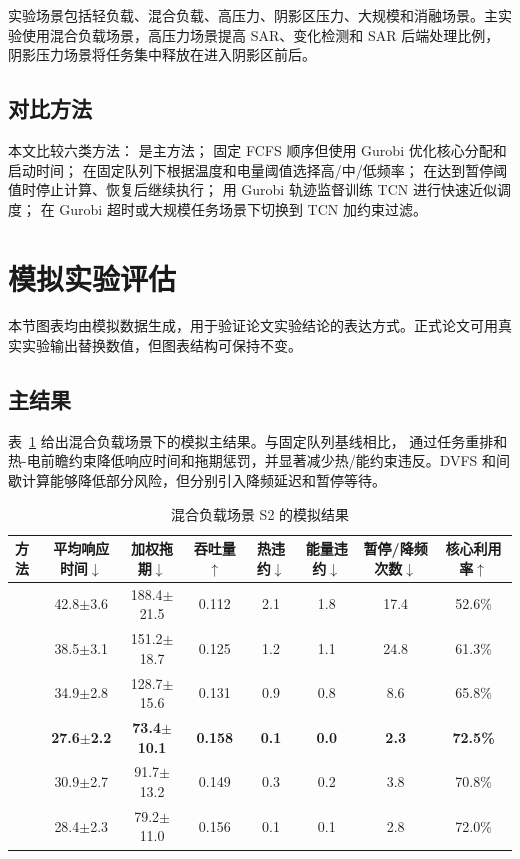 实验场景包括轻负载、混合负载、高压力、阴影区压力、大规模和消融场景。主实验使用混合负载场景，高压力场景提高 SAR、变化检测和 SAR 后端处理比例，阴影压力场景将任务集中释放在进入阴影区前后。

\subsection{对比方法}

本文比较六类方法：\rhcfull{} 是主方法；\fcfsg{} 固定 FCFS 顺序但使用 Gurobi 优化核心分配和启动时间；\dvfs{} 在固定队列下根据温度和电量阈值选择高/中/低频率；\intermittent{} 在达到暂停阈值时停止计算、恢复后继续执行；\tcns{} 用 Gurobi 轨迹监督训练 TCN 进行快速近似调度；\hybrid{} 在 Gurobi 超时或大规模任务场景下切换到 TCN 加约束过滤。

\section{模拟实验评估}

本节图表均由模拟数据生成，用于验证论文实验结论的表达方式。正式论文可用真实实验输出替换数值，但图表结构可保持不变。

\subsection{主结果}

表~\ref{tab:main-results} 给出混合负载场景下的模拟主结果。与固定队列基线相比，\rhcfull{} 通过任务重排和热-电前瞻约束降低响应时间和拖期惩罚，并显著减少热/能约束违反。DVFS 和间歇计算能够降低部分风险，但分别引入降频延迟和暂停等待。

\begin{table}[t]
\centering
\caption{混合负载场景 S2 的模拟结果}
\label{tab:main-results}
\begin{tabular}{lccccccc}
\toprule
方法 & 平均响应时间$\downarrow$ & 加权拖期$\downarrow$ & 吞吐量$\uparrow$ & 热违约$\downarrow$ & 能量违约$\downarrow$ & 暂停/降频次数$\downarrow$ & 核心利用率$\uparrow$ \\
\midrule
\intermittent{} & 42.8$\pm$3.6 & 188.4$\pm$21.5 & 0.112 & 2.1 & 1.8 & 17.4 & 52.6\% \\
\dvfs{} & 38.5$\pm$3.1 & 151.2$\pm$18.7 & 0.125 & 1.2 & 1.1 & 24.8 & 61.3\% \\
\fcfsg{} & 34.9$\pm$2.8 & 128.7$\pm$15.6 & 0.131 & 0.9 & 0.8 & 8.6 & 65.8\% \\
\rhcfull{} & \textbf{27.6$\pm$2.2} & \textbf{73.4$\pm$10.1} & \textbf{0.158} & \textbf{0.1} & \textbf{0.0} & \textbf{2.3} & \textbf{72.5\%} \\
\tcns{} & 30.9$\pm$2.7 & 91.7$\pm$13.2 & 0.149 & 0.3 & 0.2 & 3.8 & 70.8\% \\
\hybrid{} & 28.4$\pm$2.3 & 79.2$\pm$11.0 & 0.156 & 0.1 & 0.1 & 2.8 & 72.0\% \\
\bottomrule
\end{tabular}
\end{table}

